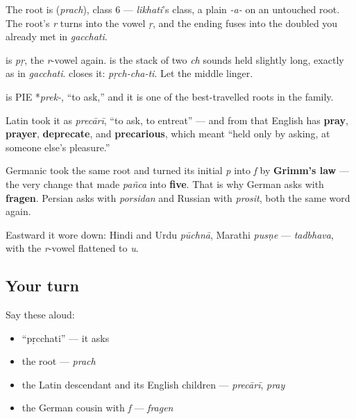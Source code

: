 The root is \textbf{} (\emph{prach}), class 6 — \emph{likhati}'s class, a plain \emph{-a-} on an untouched root. The root's \emph{r} turns into the vowel \emph{ṛ}, and the ending fuses into the doubled \textbf{} you already met in \emph{gacchati}.

\begin{sounds}
\textbf{} is \emph{pṛ}, the \emph{r}-vowel again. \textbf{} is the stack of two \emph{ch} sounds held slightly long, exactly as in \emph{gacchati}. \textbf{} closes it: \emph{pṛch-cha-ti}. Let the middle linger.
\end{sounds}

\begin{cousinweb}
\textbf{} is PIE *\emph{prek-}, \textquotedblleft{}to ask,\textquotedblright{} and it is one of the best-travelled roots in the family.

Latin took it as \emph{precārī}, \textquotedblleft{}to ask, to entreat\textquotedblright{} — and from that English has \textbf{pray}, \textbf{prayer}, \textbf{deprecate}, and \textbf{precarious}, which meant \textquotedblleft{}held only by asking, at someone else's pleasure.\textquotedblright{}

Germanic took the same root and turned its initial \emph{p} into \emph{f} by \textbf{Grimm's law} — the very change that made \emph{pañca} into \textbf{five}. That is why German asks with \textbf{fragen}. Persian asks with \emph{porsidan} and Russian with \emph{prosit}, both the same word again.

Eastward it wore down: Hindi and Urdu \emph{pūchnā}, Marathi \emph{pusṇe} — \emph{tadbhava}, with the \emph{r}-vowel flattened to \emph{u}.
\end{cousinweb}

\subsection*{Your turn}
Say these aloud:

\begin{itemize}
\raggedright
  \item \textquotedblleft{}pṛcchati\textquotedblright{} — it asks
  \item the root — \emph{prach}
  \item the Latin descendant and its English children — \emph{precārī}, \emph{pray}
  \item the German cousin with \emph{f} — \emph{fragen}
\end{itemize}


